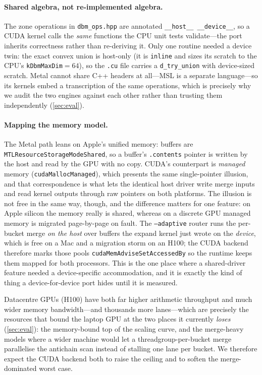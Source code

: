\documentclass[11pt]{article}
\newcommand{\code}[1]{\texttt{\small #1}}
\begin{document}
\paragraph{Shared algebra, not re-implemented algebra.} The zone operations in \code{dbm\_ops.hpp} are
annotated \code{\_\_host\_\_ \_\_device\_\_}, so a CUDA kernel calls the \emph{same} functions the CPU
unit tests validate---the port inherits correctness rather than re-deriving it. Only one routine needed
a device twin: the exact convex union is host-only (it is \code{inline} and sizes its scratch to the
CPU's \code{kDbmMaxDim}$=64$), so the \code{.cu} file carries a \code{d\_try\_union} with device-sized
scratch. Metal cannot share C++ headers at all---MSL is a separate language---so its kernels embed a
transcription of the same operations, which is precisely why we audit the two engines against each
other rather than trusting them independently (\cref{sec:eval}).

\paragraph{Mapping the memory model.} The Metal path leans on Apple's unified memory: buffers are
\code{MTLResourceStorageModeShared}, so a buffer's \code{.contents} pointer is written by the host and
read by the GPU with no copy. CUDA's counterpart is \emph{managed} memory
(\code{cudaMallocManaged}), which presents the same single-pointer illusion, and that correspondence is
what lets the identical host driver write merge inputs and read kernel outputs through raw pointers on
both platforms. The illusion is not free in the same way, though, and the difference matters for one
feature: on Apple silicon the memory really is shared, whereas on a discrete GPU managed memory is
migrated page-by-page on fault. The \code{--adaptive} router runs the per-bucket merge \emph{on the
host} over buffers the expand kernel just wrote on the \emph{device}, which is free on a Mac and a
migration storm on an H100; the CUDA backend therefore marks those pools
\code{cudaMemAdviseSetAccessedBy} so the runtime keeps them mapped for both processors. This is the
one place where a shared-driver feature needed a device-specific accommodation, and it is exactly the
kind of thing a device-for-device port hides until it is measured.

Datacentre GPUs (H100) have both far higher arithmetic throughput and much
wider memory bandwidth---and thousands more lanes---which are precisely the resources that bound the
laptop GPU at the two places it currently \emph{loses} (\cref{sec:eval}): the memory-bound top of the
scaling curve, and the merge-heavy models where a wider machine would let a threadgroup-per-bucket
merge parallelise the antichain scan instead of stalling one lane per bucket. We therefore expect the
CUDA backend both to raise the ceiling and to soften the merge-dominated worst case.
\end{document}
